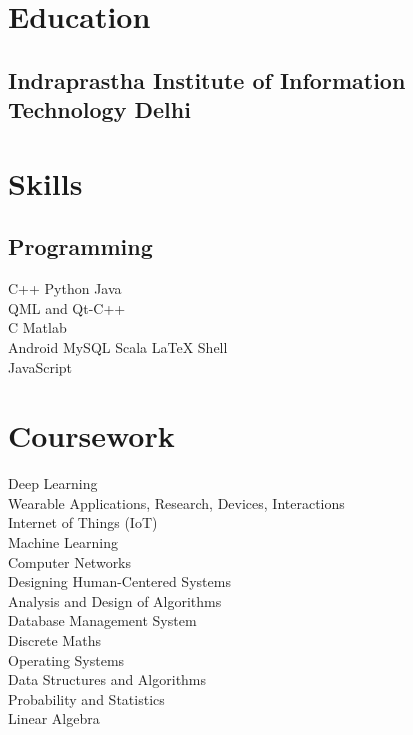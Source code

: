 \documentclass[]{deedy-resume-reversed}
\begin{document}
\begin{minipage}[t]{0.33\textwidth}


\section{Education} 

\subsection{Indraprastha Institute of Information Technology Delhi}
\sectionsep


\section{Skills}
\subsection{Programming}
C++ \textbullet{}  Python \textbullet{} Java \\ \textbullet{} QML and Qt-C++\\ 
C \textbullet{} Matlab \\
Android \textbullet{} MySQL \textbullet{} Scala \textbullet{} \LaTeX \textbullet{} Shell \\ \textbullet{} JavaScript


\sectionsep



\section{Coursework}

Deep Learning\\
Wearable Applications, Research, Devices, Interactions\\
Internet of Things (IoT)\\
Machine Learning \\
Computer Networks \\
Designing Human-Centered Systems\\
Analysis and Design of Algorithms \\
Database Management System\\
Discrete Maths\\
Operating Systems \\
Data Structures and Algorithms \\
Probability and Statistics\\
Linear Algebra\\
\sectionsep


\end{minipage}
\end{document}
